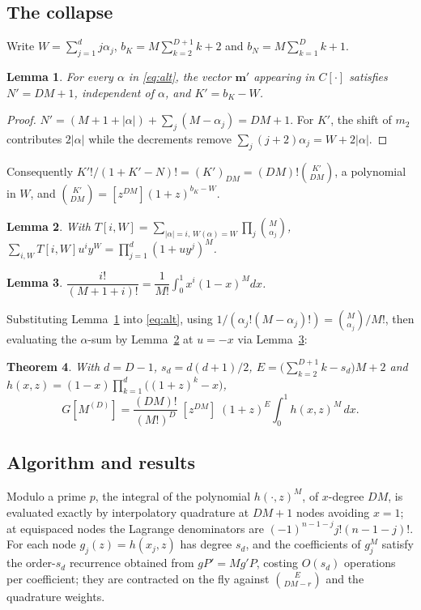\documentclass[11pt]{article}
\newtheorem{theorem}{Theorem}[section]
\newtheorem{lemma}[theorem]{Lemma}
\theoremstyle{definition}
\newcommand{\ff}[2]{(#1)_{#2}}
\begin{document}
\subsection{The collapse}

Write $W=\sum_{j=1}^{d}j\alpha_j$, $b_K=M\sum_{k=2}^{D+1}k+2$ and
$b_N=M\sum_{k=1}^{D}k+1$.

\begin{lemma}\label{lem:const}
For every $\alpha$ in \eqref{eq:alt}, the vector $\mathbf m'$ appearing in
$C[\cdot]$ satisfies $N'=DM+1$, independent of $\alpha$, and $K'=b_K-W$.
\end{lemma}

\begin{proof}
$N'=(M{+}1{+}|\alpha|)+\sum_j(M-\alpha_j)=DM+1$. For $K'$, the shift of $m_2$
contributes $2|\alpha|$ while the decrements remove
$\sum_j(j{+}2)\alpha_j=W+2|\alpha|$.
\end{proof}

Consequently $K'!/(1+K'-N)!=\ff{K'}{DM}=(DM)!\binom{K'}{DM}$, a polynomial in
$W$, and $\binom{K'}{DM}=[z^{DM}](1+z)^{b_K-W}$.

\begin{lemma}\label{lem:prod}
With $T[i,W]=\sum_{|\alpha|=i,\,W(\alpha)=W}\prod_j\binom{M}{\alpha_j}$,
$\sum_{i,W}T[i,W]u^{i}y^{W}=\prod_{j=1}^{d}(1+uy^{j})^{M}$.
\end{lemma}

\begin{lemma}\label{lem:beta}
$\dfrac{i!}{(M{+}1{+}i)!}=\dfrac{1}{M!}\displaystyle\int_0^1x^{i}(1-x)^{M}dx$.
\end{lemma}

Substituting Lemma~\ref{lem:const} into \eqref{eq:alt}, using
$1/(\alpha_j!(M-\alpha_j)!)=\binom{M}{\alpha_j}/M!$, then evaluating the
$\alpha$-sum by Lemma~\ref{lem:prod} at $u=-x$ via Lemma~\ref{lem:beta}:

\begin{theorem}\label{thm:geode}
With $d=D-1$, $s_d=d(d+1)/2$,
$E=\bigl(\sum_{k=2}^{D+1}k-s_d\bigr)M+2$ and
$h(x,z)=(1-x)\prod_{k=1}^{d}\bigl((1+z)^{k}-x\bigr)$,
\[
  G[M^{(D)}]=\frac{(DM)!}{(M!)^{D}}\;[z^{DM}]\;(1+z)^{E}
   \int_0^1h(x,z)^{M}\,dx .
\]
\end{theorem}

\subsection{Algorithm and results}

Modulo a prime $p$, the integral of the polynomial $h(\cdot,z)^{M}$, of
$x$-degree $DM$, is evaluated exactly by interpolatory quadrature at $DM+1$
nodes avoiding $x=1$; at equispaced nodes the Lagrange denominators are
$(-1)^{n-1-j}j!(n{-}1{-}j)!$. For each node $g_j(z)=h(x_j,z)$ has degree $s_d$,
and the coefficients of $g_j^{M}$ satisfy the order-$s_d$ recurrence obtained
from $gP'=Mg'P$, costing $O(s_d)$ operations per coefficient; they are
contracted on the fly against $\binom{E}{DM-r}$ and the quadrature weights.
\end{document}

